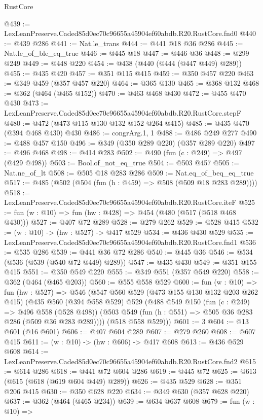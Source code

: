 \begin{lexlean}{RustCore}
\begin{coremodule}
@439 := LexLeanPreserve.Caded85d0ec70c96655a45904ef60abdb.R20.RustCore.fnd0
@440 := @439 @286
@441 := Nat.le_trans
@444 := @441 @18 @36 @286
@445 := Nat.le_of_ble_eq_true
@446 := @445 @18
@447 := @446 @36
@448 := @299 @249
@449 := @448 @220
@454 := @438 (@440 (@444 (@447 @449) @289))
@455 := @435 @420
@457 := @351 @115 @415
@459 := @350 @457 @220
@463 := @349 @459 (@357 @457 @220)
@464 := @365 @130
@465 := @368 @132
@468 := @362 (@464 (@465 @152))
@470 := @463 @468 @430
@472 := @455 @470 @430
@473 := LexLeanPreserve.Caded85d0ec70c96655a45904ef60abdb.R20.RustCore.stepF
@480 := @472 (@473 @115 @130 @132 @152 @264 @415)
@485 := @435 @470 (@394 @468 @430) @430
@486 := congrArg.{1, 1}
@488 := @486 @249 @277
@490 := @488 @457 @150
@496 := @349 (@350 @289 @220) (@357 @289 @220)
@497 := @496 @468
@498 := @414 @283
@502 := @490 (fun (c : @249) => @497 (@429 @498))
@503 := Bool.of_not_eq_true
@504 := @503 @457
@505 := Nat.ne_of_lt
@508 := @505 @18 @283 @286
@509 := Nat.eq_of_beq_eq_true
@517 := @485 (@502 (@504 (fun (h : @459) => @508 (@509 @18 @283 @289))))
@518 := LexLeanPreserve.Caded85d0ec70c96655a45904ef60abdb.R20.RustCore.iteF
@525 := fun (w : @10) => fun (hw : @428) => @454 (@480 (@517 (@518 @468 @430)))
@527 := @407 @72 @289
@528 := @279 @262
@529 := @528 @415
@532 := (w : @10) -> (hw : @527) -> @417 @529
@534 := @436 @430 @529
@535 := LexLeanPreserve.Caded85d0ec70c96655a45904ef60abdb.R20.RustCore.fnd1
@536 := @535 @286
@539 := @441 @36 @72 @286
@540 := @445 @36
@546 := @534 (@536 (@539 (@540 @72 @449) @289))
@547 := @435 @430
@549 := @351 @155 @415
@551 := @350 @549 @220
@555 := @349 @551 (@357 @549 @220)
@558 := @362 (@464 (@465 @203))
@560 := @555 @558 @529
@600 := fun (w : @10) =>
  fun (hw : @527) =>
  @546
    (@547
      @560
      @529
      (@473 @155 @130 @132 @203 @262 @415)
      (@435
        @560
        (@394 @558 @529)
        @529
        (@488
          @549
          @150
          (fun (c : @249) => @496 @558 (@528 @498))
          (@503 @549 (fun (h : @551) => @505 @36 @283 @286 (@509 @36 @283 @289))))
        (@518 @558 @529)))
@601 := 3
@604 := @13 @601 (@16 @601)
@606 := @407 @604 @289
@607 := @279 @260
@608 := @607 @415
@611 := (w : @10) -> (hw : @606) -> @417 @608
@613 := @436 @529 @608
@614 := LexLeanPreserve.Caded85d0ec70c96655a45904ef60abdb.R20.RustCore.fnd2
@615 := @614 @286
@618 := @441 @72 @604 @286
@619 := @445 @72
@625 := @613 (@615 (@618 (@619 @604 @449) @289))
@626 := @435 @529
@628 := @351 @206 @415
@630 := @350 @628 @220
@634 := @349 @630 (@357 @628 @220)
@637 := @362 (@464 (@465 @234))
@639 := @634 @637 @608
@679 := fun (w : @10) =>

\end{coremodule}
\end{lexlean}
